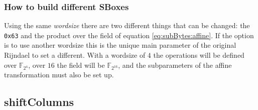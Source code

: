 \documentclass[10pt,a4paper,twoside]{llncs}
\newcommand{\Fpn}[2]{\ensuremath{\mathbb{F}_{#1^#2}}}
\begin{document}
\subsubsection{How to build different SBoxes}

Using the same \emph{wordsize} there are two different things that can be changed: the \texttt{0x63} and the product over the field of equation \ref{eq:subBytes:affine}. If the option is to use another wordsize this is the unique main parameter of the original Rijndael to set a different. With a wordsize of $4$ the operations will be defined over \Fpn{2}{4}, over $16$ the field will be \Fpn{2}{{16}}, and the subparameters of the affine transformation must also be set up.

\subsection{shiftColumns}
\end{document}
